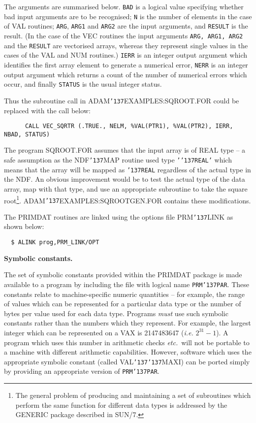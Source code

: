 \documentclass[twoside,11pt]{article}
\renewcommand{\_}{{\tt\char'137}}
\newcommand{\xref}[3]{#1}
\begin{document}
The arguments are summarised below. 
{\tt BAD} is a logical value specifying whether 
bad input arguments are to be recognised;
{\tt N} is the number of elements in the case of VAL routines;
{\tt ARG}, {\tt ARG1} and {\tt ARG2} are the input
arguments, and {\tt RESULT} is the result.
(In the case of the VEC routines the input 
arguments {\tt ARG, ARG1, ARG2}  and the {\tt RESULT}  are vectorised arrays, 
whereas they represent  single values in the cases of the VAL and NUM 
routines.)
{\tt IERR} is an integer output argument which identifies the
first array element to generate a numerical error,
{\tt NERR} is an integer output argument which returns a count of the
number of numerical errors which occur,
and finally {\tt STATUS} is the usual integer status.

Thus the subroutine call in ADAM\_EXAMPLES:SQROOT.FOR could be
replaced with the call below:
{\small
\begin{verbatim}
      CALL VEC_SQRTR (.TRUE., NELM, %VAL(PTR1), %VAL(PTR2), IERR, NBAD, STATUS)
\end{verbatim}}
The program SQROOT.FOR assumes that the input array is of
REAL type -- a safe assumption as
the NDF\_MAP routine used type {\tt'\_REAL'} which means that the array 
will be mapped as {\tt\_REAL} regardless of the actual type in the NDF.
An obvious improvement would be to test the actual type of the data array,
map with that type, and
use an appropriate subroutine to take the square 
root\footnote{The general problem of producing and maintaining 
a set of subroutines which perform the same function for different 
data types is addressed by  the GENERIC package described in
\xref{SUN/7}{sun7}{}.}.
ADAM\_EXAMPLES:SQROOTGEN.FOR contains these modifications.

The PRIMDAT routines are linked using the options file PRM\_LINK as shown 
below:
\begin{verbatim}
  $ ALINK prog,PRM_LINK/OPT
\end{verbatim}

{\bigskip\large\bf Symbolic constants.}

The  set of symbolic constants provided within the PRIMDAT package is 
made available to a program by including the file with logical name 
{\tt PRM\_PAR}. 
These constants relate to machine-specific numeric quantities -- for 
example, the
range of values which can be represented for a particular data type or 
the number of bytes per value used for each data type.
Programs {\sl must\/}  use such symbolic constants  rather than 
the numbers which they represent.
For example, the largest integer which can be represented on a VAX is
2147483647 ({\it i.e.} $2^{31}-1$).
A program which uses this number in arithmetic checks 
{\it etc.}\ will not be portable to a machine with different arithmetic capabilities.
However, software which uses the appropriate symbolic constant  (called 
VAL\_\_MAXI) can
be  ported  simply by providing an appropriate version of {\tt PRM\_PAR}.
\end{document}

